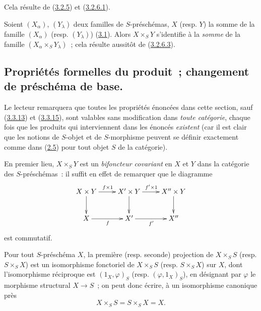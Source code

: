 Cela résulte de (\hyperref[I.3.2.5-fr]{3.2.5}) et
(\hyperref[I.3.2.6.1-fr]{3.2.6.1}).

\begin{env}[3.2.8]
\label{I.3.2.8-fr}
Soient $(X_\alpha)$, $(Y_\lambda)$ deux familles de $S$-préschémas, $X$
(resp. $Y$) la somme de la famille $(X_\alpha)$ (resp. $(Y_\lambda)$)
(\hyperref[subsection:I.3.1-fr]{3.1}). Alors $X\times_S Y$ s'identifie à la
\emph{somme} de la famille $(X_\alpha\times_S Y_\lambda)$~; cela résulte
aussitôt de (\hyperref[I.3.2.6.3-fr]{3.2.6.3}).
\end{env}

\subsection{Propriétés formelles du produit~; changement de préschéma de base.}
\label{subsection:I.3.3-fr}

\begin{env}[3.3.1]
\label{I.3.3.1-fr}
Le lecteur remarquera que toutes les propriétés énoncées dans cette section,
sauf (\hyperref[I.3.3.13-fr]{3.3.13}) et
(\hyperref[I.3.3.15-fr]{3.3.15}), sont valables sans modification dans
\emph{toute catégorie}, chaque fois que les produits qui interviennent dans
les énoncés \emph{existent} (car il est clair que les notions de $S$-objet et
de $S$-morphisme peuvent se définir exactement comme dans
(\hyperref[subsection:I.2.5-fr]{2.5}) pour tout objet $S$ de la catégorie).
\end{env}

\begin{env}[3.3.2]
\label{I.3.3.2-fr}
En premier lieu, $X\times_S Y$ est un \emph{bifoncteur covariant} en $X$ et
$Y$ dans la catégorie des $S$-préschémas~: il suffit en effet de remarquer
que le diagramme
\[
  \xymatrix{
    X\times Y\ar[r]^{f\times 1}\ar[d] &
    X'\times Y\ar[r]^{f'\times 1}\ar[d] &
    X''\times Y\ar[d]\\
    X\ar[r]_f & X'\ar[r]_{f'} & X''
  }
\]
est commutatif.
\end{env}

\begin{proposition}[3.3.3]
\label{I.3.3.3-fr}
Pour tout $S$-préschéma $X$, la première (resp. seconde) projection de
$X\times_S S$ (resp. $S\times_S X$) est un isomorphisme fonctoriel de
$X\times_S S$ (resp. $S\times_S X$) sur $X$, dont l'isomorphisme réciproque
est $(1_X,\varphi)_S$ (resp. $(\varphi,1_X)_S$), en désignant par $\varphi$
le morphisme structural $X\to S$~; on peut donc écrire, à un isomorphisme
canonique près
\[
  X\times_S S=S\times_S X=X.
\]
\end{proposition}

